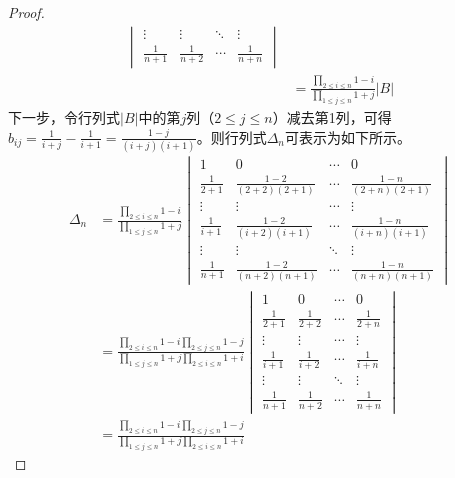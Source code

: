 \begin{proof}
\begin{equation}
\begin{split}
\begin{vmatrix}
    \vdots & \vdots & \ddots & \vdots \\
    \frac{1}{n+1} & \frac{1}{n+2} & \cdots & \frac{1}{n+n}
    \end{vmatrix}\\
    & = \frac{\prod\limits_{2\leq i \leq n}{1-i}}{\prod\limits_{1\leq j \leq n}{1+j}}
    \left\vert B \right\vert
\end{split}
\end{equation}
下一步，令行列式$\left\vert B \right\vert$中的第$j$列（$2 \leq j \leq n$）减去第1列，可得$b_{ij} = \frac{1}{i+j} - \frac{1}{i+1}=\frac{1-j}{\left(i+j\right)\left(i+1\right)}$。则行列式$\Delta_n$可表示为如下所示。
\begin{equation}\label{eq:detetminant3}
\begin{split}
    \Delta_n & = \frac{\prod\limits_{2\leq i \leq n}{1-i}}{\prod\limits_{1\leq j \leq n}{1+j}}
    \begin{vmatrix}
    1 & 0 & \cdots & 0 \\
    \frac{1}{2+1} & \frac{1-2}{\left(2+2\right)\left(2+1\right)} & \cdots & \frac{1-n}{\left(2+n\right)\left(2+1\right)} \\
    \vdots & \vdots & \cdots & \vdots \\
    \frac{1}{i+1} & \frac{1-2}{\left(i+2\right)\left(i+1\right)} & \cdots & \frac{1-n}{\left(i+n\right)\left(i+1\right)} \\
    \vdots & \vdots & \ddots & \vdots \\
    \frac{1}{n+1} & \frac{1-2}{\left(n+2\right)\left(n+1\right)} & \cdots & \frac{1-n}{\left(n+n\right)\left(n+1\right)}
    \end{vmatrix}\\
    & = \frac{\prod\limits_{2\leq i \leq n}{1-i}\prod\limits_{2\leq j \leq n}{1-j}}{\prod\limits_{1\leq j \leq n}{1+j}\prod\limits_{2\leq i \leq n}{1+i}}
    \begin{vmatrix}
    1 & 0 & \cdots & 0 \\
    \frac{1}{2+1} & \frac{1}{2+2} & \cdots & \frac{1}{2+n}\\
    \vdots & \vdots & \cdots & \vdots \\
    \frac{1}{i+1} & \frac{1}{i+2} & \cdots & \frac{1}{i+n}\\
    \vdots & \vdots & \ddots & \vdots \\
    \frac{1}{n+1} & \frac{1}{n+2} & \cdots & \frac{1}{n+n}
    \end{vmatrix}\\
    & = \frac{\prod\limits_{2\leq i \leq n}{1-i}\prod\limits_{2\leq j \leq n}{1-j}}{\prod\limits_{1\leq j \leq n}{1+j}\prod\limits_{2\leq i \leq n}{1+i}}

\end{split}
\end{equation}
\end{proof}
